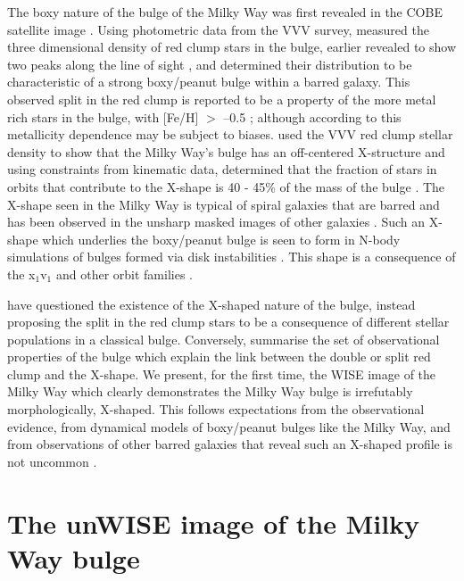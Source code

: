 \documentclass[12pt, preprint]{aastex}
\begin{document}
The boxy nature of the bulge of the Milky Way was first revealed in the COBE satellite image \citep{Dwek1995}. Using photometric data from the VVV survey, \citet{Wegg2013} measured the three dimensional density of red clump stars in the bulge, earlier revealed to show two peaks along the line of sight \citep{McWilliam2010, Nataf2010}, and determined their distribution to be characteristic of a strong boxy/peanut bulge within a barred galaxy. This observed split in the red clump is reported to be a property of the more metal rich stars in the bulge, with [Fe/H] $>$ --0.5 \citep{Ness2012, Uttenthaler2012}; although according to \citet{Nataf2014} this metallicity dependence may be subject to biases.  \citet{Portail2015b} used the VVV red clump stellar density to show that the Milky Way's bulge has an off-centered X-structure and using constraints from kinematic data, determined that the fraction of stars in orbits that contribute to the X-shape is 40 - 45\% of the mass of the bulge \citep{Portail2015a}. The X-shape seen in the Milky Way is typical of spiral galaxies that are barred and has been observed in the unsharp masked images of other galaxies \citep[e.g.][]{Bureau2006}. Such an X-shape which underlies the boxy/peanut bulge is seen to form in N-body simulations of bulges formed via disk instabilities \citep[e.g.][]{Athanassoula2005, Debattista2006, Inma2006}. This shape is a consequence of the x$_{1}$v$_{1}$ \citep{P1984, Athanassoula1992} and other orbit families \citep[e.g.][]{Portail2015b}. 

\citet{Lee2015} have questioned the existence of the X-shaped nature of the bulge, instead proposing the split in the red clump stars to be a consequence of different stellar populations in a classical bulge. Conversely,  \citet{Gonzalez2015} summarise the set of observational properties of the bulge which explain the link between the double or split red clump and the X-shape. We present, for the first time, the WISE image of the Milky Way \citep{Lang2014a} which clearly demonstrates the Milky Way bulge is irrefutably morphologically, X-shaped. This follows expectations from the observational evidence,  from dynamical models of boxy/peanut bulges like the Milky Way, and from observations of other barred galaxies that reveal such an X-shaped profile is not uncommon \citep{L2014}. 

\section{The unWISE image of the Milky Way bulge}
\end{document}
